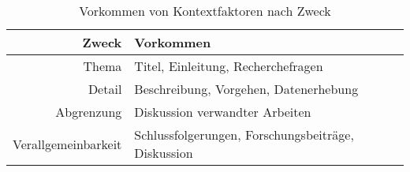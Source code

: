 \begin{table}[h!]
\begin{tabular}{ r | l }
 Zweck & Vorkommen \\
  \hline
  Thema & Titel, Einleitung, Recherchefragen \\
  Detail & Beschreibung, Vorgehen, Datenerhebung \\
  Abgrenzung & Diskussion verwandter Arbeiten \\
  Verallgemeinbarkeit & Schlussfolgerungen, Forschungsbeiträge, Diskussion\\
\end{tabular}
\caption{Vorkommen von Kontextfaktoren nach Zweck}
\label{table:vorkommen}
\end{table}
